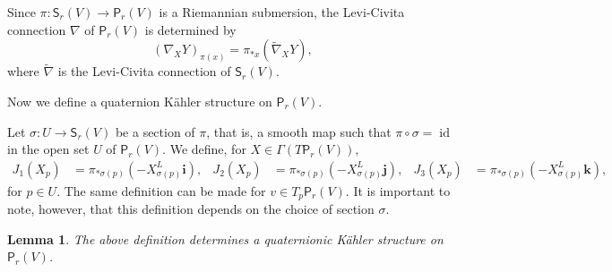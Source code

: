 \documentclass[12pt, a4paper,draft]{amsart}
\newcommand{\id}{\operatorname{id}}
\newtheorem{lemma}[theorem]{Lemma}
\theoremstyle{remark}
\begin{document}
Since $\pi\colon\mathsf{S}_r(V)\to\mathsf{P}_r(V)$ is a Riemannian submersion, the Levi-Civita connection $\nabla$ of $\mathsf{P}_r(V)$ is determined by~\cite{ONeill}
\[
(\nabla_X Y)_{\pi(x)}=\pi_{*x}(\tilde{\nabla}_X Y),
\]
where $\tilde{\nabla}$ is the Levi-Civita connection of $\mathsf{S}_r(V)$.
\medskip

Now we define a quaternion K\"ahler structure on $\mathsf{P}_r(V)$.

Let $\sigma\colon U\to\mathsf{S}_r(V)$ be a section of $\pi$, that is, a smooth map such that $\pi\circ\sigma=\id$ in the open set $U$ of $\mathsf{P}_r(V)$.
We define, for $X\in\Gamma(T\mathsf{P}_r(V))$,
\[
\begin{aligned}
J_1(X_p)&{}=\pi_{*\sigma(p)}(-X_{\sigma(p)}^L\mathbf{i}),
&J_2(X_p)&{}=\pi_{*\sigma(p)}(-X_{\sigma(p)}^L\mathbf{j}),
&J_3(X_p)&{}=\pi_{*\sigma(p)}(-X_{\sigma(p)}^L\mathbf{k}),
\end{aligned}
\]
for $p\in U$.
The same definition can be made for $v\in T_p\mathsf{P}_r(V)$.
It is important to note, however, that this definition depends on the choice of section $\sigma$.

\begin{lemma}
The above definition determines a quaternionic K\"ahler structure on $\mathsf{P}_r(V)$.
\end{lemma}
\end{document}
